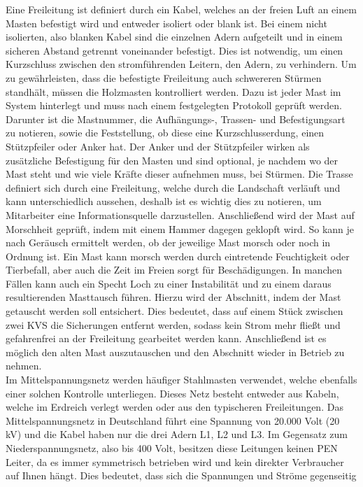 Eine Freileitung ist definiert durch ein Kabel, welches an der freien Luft an einem Masten befestigt wird und entweder isoliert oder blank ist. Bei einem 
nicht isolierten, also blanken Kabel sind die einzelnen Adern aufgeteilt und in einem sicheren Abstand getrennt voneinander befestigt. Dies ist notwendig, 
um einen Kurzschluss zwischen den stromführenden Leitern, den Adern, zu verhindern. Um zu gewährleisten, dass die befestigte Freileitung auch schwereren 
Stürmen standhält, müssen die Holzmasten kontrolliert werden. Dazu ist jeder Mast im System hinterlegt und muss nach einem festgelegten Protokoll geprüft
werden. Darunter ist die Mastnummer, die Aufhängungs-, Trassen- und Befestigungsart zu notieren, sowie die Feststellung, ob diese eine Kurzschlusserdung, 
einen Stützpfeiler oder Anker hat. Der Anker und der Stützpfeiler wirken als zusätzliche Befestigung für den Masten und sind optional, je nachdem wo der 
Mast steht und wie viele Kräfte dieser aufnehmen muss, \zB bei Stürmen. Die Trasse definiert sich durch eine Freileitung, welche durch die Landschaft 
verläuft und kann unterschiedlich aussehen, deshalb ist es wichtig dies zu notieren, um Mitarbeiter eine Informationsquelle darzustellen. 
Anschließend wird der Mast auf Morschheit geprüft, indem mit einem Hammer dagegen geklopft wird. So kann je nach Geräusch ermittelt werden, ob der 
jeweilige Mast morsch oder noch in Ordnung ist. Ein Mast kann morsch werden durch eintretende Feuchtigkeit oder Tierbefall, aber auch die Zeit im Freien 
sorgt für Beschädigungen. In manchen Fällen kann auch ein Specht Loch zu einer Instabilität und zu einem daraus resultierenden Masttausch führen. Hierzu 
wird der Abschnitt, indem der Mast getauscht werden soll entsichert. Dies bedeutet, dass auf einem Stück zwischen zwei KVS die Sicherungen entfernt werden, 
sodass kein Strom mehr fließt und gefahrenfrei an der Freileitung gearbeitet werden kann. Anschließend ist es möglich den alten Mast auszutauschen und 
den Abschnitt wieder in Betrieb zu nehmen.
 \\
Im Mittelspannungsnetz werden häufiger Stahlmasten verwendet, welche ebenfalls einer solchen Kontrolle unterliegen. Dieses Netz besteht entweder aus Kabeln, 
welche im Erdreich verlegt werden oder aus den typischeren Freileitungen. Das Mittelspannungsnetz in Deutschland führt eine Spannung von 20.000 Volt (20 kV) 
und die Kabel haben nur die drei Adern L1, L2 und L3. Im Gegensatz zum Niederspannungsnetz, also bis 400 Volt, besitzen diese Leitungen keinen PEN Leiter, 
da es immer symmetrisch betrieben wird und kein direkter Verbraucher auf Ihnen hängt. Dies bedeutet, dass sich die Spannungen und Ströme gegenseitig 
